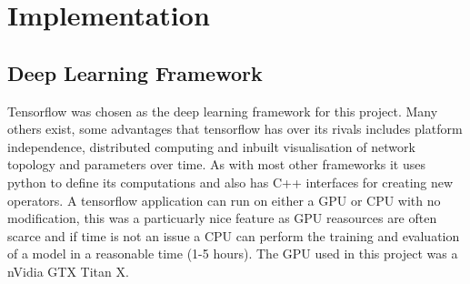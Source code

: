 \chapter{Implementation}
  \section{Deep Learning Framework}
    Tensorflow \cite{tensorflow} was chosen as the deep learning framework for this
    project. Many others exist, some advantages that tensorflow has over its rivals
    includes platform independence, distributed computing and inbuilt visualisation
    of network topology and parameters over time. As with most other frameworks it uses python
    to define its computations and also has C++ interfaces for creating new operators.
    A tensorflow application can run on either a GPU or CPU with no modification, this was
    a particuarly nice feature as GPU reasources are often scarce and if time is not an issue a CPU
    can perform the training and evaluation of a model in a reasonable time (1-5 hours). The GPU used in this project was a nVidia GTX Titan X.

